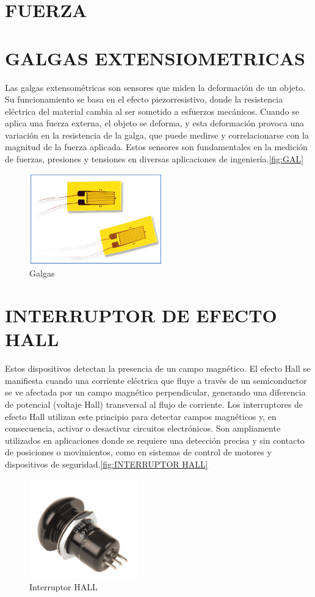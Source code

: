 \newpage
\section{FUERZA}
\section{GALGAS EXTENSIOMETRICAS}
Las galgas extensométricas son sensores que miden la deformación de un objeto. Su funcionamiento se basa en el efecto piezorresistivo, donde la resistencia eléctrica del material cambia al ser sometido a esfuerzos mecánicos. Cuando se aplica una fuerza externa, el objeto se deforma, y esta deformación provoca una variación en la resistencia de la galga, que puede medirse y correlacionarse con la magnitud de la fuerza aplicada. Estos sensores son fundamentales en la medición de fuerzas, presiones y tensiones en diversas aplicaciones de ingeniería.\autoref{fig:GAL}
\begin{figure}[h]
	\centering
	\includegraphics[width=0.3\linewidth]{img/GAL}
	\caption{Galgas }
	\label{fig:GAL}
\end{figure}

\section*{INTERRUPTOR DE EFECTO HALL}
Estos dispositivos detectan la presencia de un campo magnético. El efecto Hall se manifiesta cuando una corriente eléctrica que fluye a través de un semiconductor se ve afectada por un campo magnético perpendicular, generando una diferencia de potencial (voltaje Hall) transversal al flujo de corriente. Los interruptores de efecto Hall utilizan este principio para detectar campos magnéticos y, en consecuencia, activar o desactivar circuitos electrónicos. Son ampliamente utilizados en aplicaciones donde se requiere una detección precisa y sin contacto de posiciones o movimientos, como en sistemas de control de motores y dispositivos de seguridad.\autoref{fig:INTERRUPTOR HALL}
\begin{figure}[h]
	\centering
	\includegraphics[width=0.3\linewidth]{img/INTERRUPTOR HALL}
	\caption{ Interruptor HALL }
	\label{fig:INTERRUPTOR HALL}
\end{figure}


